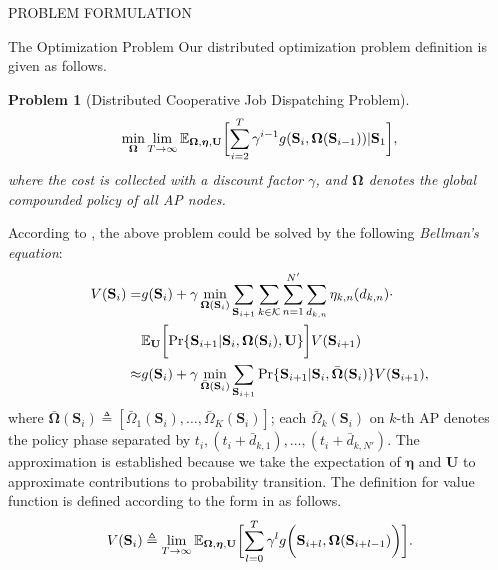 \documentclass[10pt, conference, letterpaper]{IEEEtran}
\newtheorem{problem}{Problem}
\newcommand{\define}{\triangleq}
\newcommand{\vecG}{\boldsymbol}
\renewcommand{\vec}{\mathbf}
\DeclarePairedDelimiter{\Paren}{\bigg(}{\bigg)}
\DeclarePairedDelimiter{\Bracket}{\bigg[}{\bigg]}
\newcommand{\apSet}{\mathcal{K}}
\newcommand{\Stat}{\mathbf{S}}
\newcommand{\Policy}{\boldsymbol{\Omega}}
\newcommand{\BPolicy}{\bar{\Policy}}
\begin{document}
\begin{section}{PROBLEM FORMULATION}
\begin{subsection}{The Optimization Problem}
            Our distributed optimization problem definition is given as follows.
            \begin{problem}[Distributed Cooperative Job Dispatching Problem]
                \begin{gather}
                    \min_{\Policy} \lim_{T \to \infty}
                        \mathbb{E}_{\Policy, \vecG{\eta}, \vec{U}}
                            \Bracket{\sum_{i=2}^{T} \gamma^{i-1} g(\Stat_{i}, \Policy(\Stat_{i-1}))|\Stat_1},
                \end{gather}
                where the cost is collected with a discount factor $\gamma$, and $\Policy$ denotes the global compounded policy of all AP nodes.
            \end{problem}

            According to \cite{sutton1998introduction}, the above problem could be solved by the following \emph{Bellman's equation}:
            \begin{align}
                V(\Stat_i) =& g(\Stat_i) +
                    \gamma \min_{\Policy(\Stat_{i})} \sum_{\Stat_{i+1}} \sum_{k\in\apSet}\sum_{n=1}^{N'}\sum_{d_{k,n}} \eta_{k,n}(d_{k,n}) \cdot
                    \nonumber\\
                    &\mathbb{E}_{\vec{U}}\Bracket{
                            \Pr\{ \Stat_{i+1}|\Stat_{i}, \Policy(\Stat_{i}), \vec{U} \}
                        } V(\Stat_{i+1})
                \nonumber\\
                \approx& g(\Stat_i) + \gamma \min_{\BPolicy(\Stat_{i})} \sum_{\Stat_{i+1}} \Pr\{ \Stat_{i+1}|\Stat_{i}, \BPolicy(\Stat_{i}) \} V(\Stat_{i+1}),
            \end{align}
            {\color{red}where $\BPolicy(\Stat_{i}) \define [\bar{\Omega}_1(\Stat_{i}), \dots, \bar{\Omega}_K(\Stat_{i})]$; each $\bar{\Omega}_k(\Stat_{i})$ on $k$-th AP denotes the policy phase separated by $t_i, (t_i+\bar{d}_{k,1}), \dots, (t_i+\bar{d}_{k,N'})$. The approximation is established because we take the expectation of $\vecG{\eta}$ and $\vec{U}$ to approximate contributions to probability transition.}
            The definition for value function is defined according to the form in \cite{sutton1998introduction} as follows.
            \begin{align}
                V(\Stat_{i}) \define \lim_{T\to\infty}
                    \mathbb{E}_{\Policy,\vecG{\eta},\vec{U}} \Bracket{
                        \sum_{l=0}^{T} \gamma^l g\Paren{\Stat_{i+l}, \Policy(\Stat_{i+l-1})}
                    }.
            \end{align}


\end{subsection}
\end{section}
\end{document}
